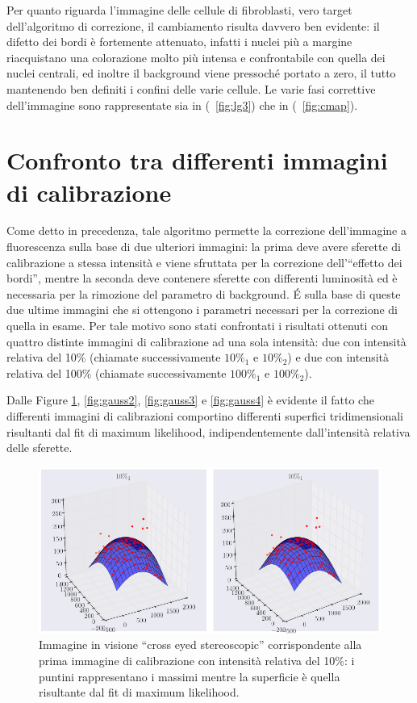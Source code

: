 Per quanto riguarda l'immagine delle cellule di fibroblasti, vero target dell'algoritmo di correzione, il cambiamento risulta davvero ben evidente: il difetto dei bordi è fortemente attenuato, infatti i nuclei più a margine riacquistano una colorazione molto più intensa e confrontabile con quella dei nuclei centrali, ed inoltre il background viene pressoché portato a zero, il tutto mantenendo ben definiti i confini delle varie cellule.
Le varie fasi correttive dell'immagine sono rappresentate sia in (\figurename~\ref{fig:lg3}) che in (\figurename~\ref{fig:cmap}).


\section{Confronto tra differenti immagini di calibrazione}

Come detto in precedenza, tale algoritmo permette la correzione dell'immagine a fluorescenza sulla base di due ulteriori immagini: la prima deve avere sferette di calibrazione a stessa intensità e viene sfruttata per la correzione dell'``effetto dei bordi'', mentre la seconda deve contenere sferette con differenti luminosità ed è necessaria per la rimozione del parametro di background. 
\'E sulla base di queste due ultime immagini che si ottengono i parametri necessari per la correzione di quella in esame.
Per tale motivo sono stati confrontati i risultati ottenuti con quattro distinte immagini di calibrazione ad una sola intensità: due con intensità relativa del 10\% (chiamate successivamente $10\%_1$ e $10\%_2$) e due con intensità relativa del 100\% (chiamate successivamente $100\%_1$ e $100\%_2$).

Dalle Figure \ref{fig:gauss1}, \ref{fig:gauss2}, \ref{fig:gauss3} e \ref{fig:gauss4} è evidente il fatto che differenti immagini di calibrazioni comportino differenti superfici tridimensionali risultanti dal fit di maximum likelihood, indipendentemente dall'intensità relativa delle sferette.

\begin{figure}
 \centering
 \includegraphics[scale=.45]{img/CAP4gauss1.png}
 \caption{\small{Immagine in visione ``cross eyed stereoscopic'' corrispondente alla prima immagine di calibrazione con intensità relativa del 10\%: i puntini rappresentano i massimi mentre la superficie è quella risultante dal fit di maximum likelihood.}}
 \label{fig:gauss1}
\end{figure}

